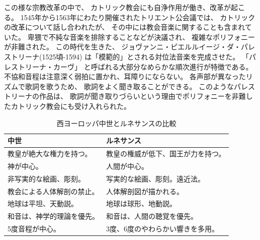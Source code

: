 \documentclass[a4j]{jarticle}
\begin{document}
この様な宗教改革の中で、
カトリック教会にも自浄作用が働き、改革が起こる。
1545年から1563年にわたり開催されたトリエント公会議では、
カトリックの改革について話し合われたが、
その中には教会音楽に関することも含まれていた。
卑猥で不純な音楽を排除することなどが決議され、
複雑なポリフォニーが非難された。
この時代を生きた、
ジョヴァンニ・ピエルルイージ・ダ・パレストリーナ(1525頃-1594)
は「模範的」とされる対位法音楽を完成させた。
「パレストリーナ・カーヴ」
と呼ばれる大部分なめらかな順次進行が特徴である。
不協和音程は注意深く弱拍に置かれ、耳障りにならない。
各声部が異なったリズムで歌詞を歌うため、
歌詞をよく聞き取ることができる。
このようなパレストリーナの作品は、
歌詞が聞き取りづらいという理由でポリフォニーを非難したカトリック教会にも受け入れられた。

\begin{table}[tb]
 \begin{center}
  \caption{西ヨーロッパ中世とルネサンスの比較}
  \label{tab:comparison}
  \begin{tabular}{|l|l|} \hline
  中世                       & ルネサンス                         \\
  \hline \hline
  教皇が絶大な権力を持つ。   & 教皇の権威が低下、国王が力を持つ。 \\ \hline
  神が中心。                 & 人間が中心。                       \\ \hline
  非写実的な絵画、彫刻。     & 写実的な絵画、彫刻。遠近法。       \\ \hline
  教会による人体解剖の禁止。 & 人体解剖図が描かれる。             \\ \hline
  地球は平坦、天動説。       & 地球は球形、地動説。               \\ \hline
  和音は、神学的理論を優先。 & 和音は、人間の聴覚を優先。         \\
  5度音程が中心。            & 3度、6度のやわらかい響きを多用。   \\ \hline
  \end{tabular}
 \end{center}
\end{table}
\end{document}
